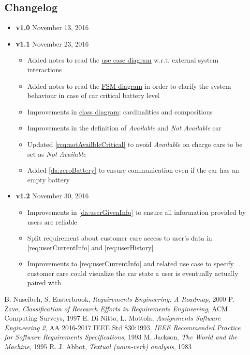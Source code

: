 \begin{appendices}
	\section{Changelog}
	\begin{itemize}
		\item \textbf{v1.0} November 13, 2016
		\item \textbf{v1.1} November 23, 2016
		\begin{itemize}
			\item Added notes to read the \hyperref[fig:usecase]{use case diagram} w.r.t. external system interactions
			\item Added notes to read the \hyperref[fig:carFSA]{FSM diagram} in order to clarify the system behaviour in case of car critical battery level
			\item Improvements in \hyperref[fig:classDiagram]{class diagram}: cardinalities and compositions
			\item Improvements in the definition of \emph{Available} and \emph{Not Available} car
			\item Updated \ref{req:notAvailbleCritical} to avoid \emph{Available} on charge cars to be set as \emph{Not Available}
			\item Added \ref{da:zeroBattery} to ensure communication even if the car has an empty battery
		\end{itemize}
		\item \textbf{v1.2} November 30, 2016
		\begin{itemize}
			\item Improvements in \ref{da:userGivenInfo} to ensure all information provided by users are reliable
			\item Split requirement about customer care access to user's data in
			\ref{req:userCurrentInfo} and \ref{req:userHistory}
			\item Improvements to \ref{req:userCurrentInfo} and related use case to specify
			customer care could visualize the car state a user is eventually actually paired with 
		\end{itemize}
	\end{itemize}
\end{appendices}
\clearpage
\begin{thebibliography}{9}
B. Nuseibeh, S. Easterbrook, \emph{Requirements Engineering: A Roadmap}, 2000
P. Zave, \emph{Classification of Research Efforts in Requirements
Engineering}, ACM Computing Surveys, 1997
 E. Di Nitto, L. Mottola, \emph{Assignments Software Engineering 2}, AA 2016-2017
IEEE Std 830:1993, \emph{IEEE Recommended Practice for Software Requirements Specifications}, 1993
M. Jackson, \emph{The World and the Machine}, 1995
R. J. Abbot, \emph{Textual (noun-verb) analysis}, 1983
\end{thebibliography}